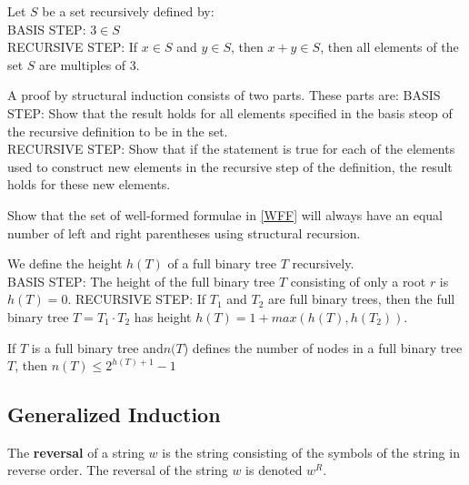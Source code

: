 \begin{theorem}
Let $S$ be a set recursively defined by:\\
BASIS STEP: $3 \in S$ \\
RECURSIVE STEP: If $x \in S$ and $y\in S$, then $x+y \in S$,
then all elements of the set $S$ are multiples of 3.
\end{theorem}

\begin{definition} 
A proof by structural induction consists of two parts. These parts are:
BASIS STEP: Show that the result holds for all elements specified in the basis steop of the recursive definition to be in the set. \\
RECURSIVE STEP: Show that if the statement is true for each of the elements used to construct new elements in the recursive step of the definition, the result holds for these new elements.
\end{definition}
 
\begin{theorem}
Show that the set of well-formed formulae in \ref{WFF} will always have an equal number of left and right parentheses using structural recursion.
\end{theorem}



\begin{definition}
We define the height $h(T)$ of a full binary tree $T$ recursively.\\
BASIS STEP: The height of the full binary tree $T$ consisting of only a root $r$ is $h(T)=0$.
RECURSIVE STEP:  If $T_1$ and $T_2$ are full binary trees, then the full binary tree $T=T_1 \cdot T_2$ has height $h(T)=1 + max(h(T), h(T_2))$.
\end{definition}

\begin{theorem}
If $T$ is a full binary tree and$ n(T$) defines the number of nodes in a full binary tree $T$, then $n(T) \le 2^{h(T)+1} -1$
\end{theorem}

  \subsection {Generalized Induction}
\begin{definition}
The \textbf{reversal} of a string $w$ is the string consisting of the symbols of the string in reverse order. The reversal of the string $w$ is denoted $w^R$.
\end{definition}

